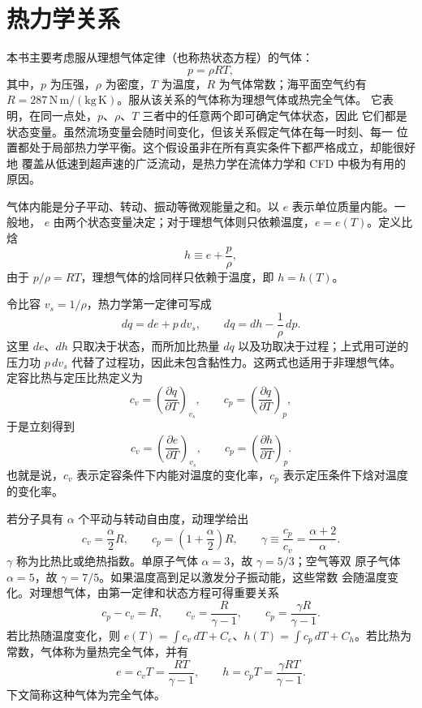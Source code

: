 \documentclass[11pt,a4paper,openany,fontset=none]{ctexbook}
\begin{document}
\section{热力学关系}

本书主要考虑服从理想气体定律（也称热状态方程）的气体：
\begin{equation}
  p=\rho RT,
\end{equation}
其中，$p$ 为压强，$\rho$ 为密度，$T$ 为温度，$R$ 为气体常数；海平面空气约有
$R=287\,\mathrm{N\,m/(kg\,K)}$。服从该关系的气体称为理想气体或热完全气体。
它表明，在同一点处，$p$、$\rho$、$T$ 三者中的任意两个即可确定气体状态，因此
它们都是状态变量。虽然流场变量会随时间变化，但该关系假定气体在每一时刻、每一
位置都处于局部热力学平衡。这个假设虽非在所有真实条件下都严格成立，却能很好地
覆盖从低速到超声速的广泛流动，是热力学在流体力学和 CFD 中极为有用的原因。

气体内能是分子平动、转动、振动等微观能量之和。以 $e$ 表示单位质量内能。一般地，
$e$ 由两个状态变量决定；对于理想气体则只依赖温度，$e=e(T)$。定义比焓
\begin{equation}
  h\equiv e+\frac{p}{\rho},
\end{equation}
由于 $p/\rho=RT$，理想气体的焓同样只依赖于温度，即 $h=h(T)$。

令比容 $v_s=1/\rho$，热力学第一定律可写成
\begin{equation}
  dq=de+p\,dv_s,
  \qquad
  dq=dh-\frac{1}{\rho}\,dp .
\end{equation}
这里 $de$、$dh$ 只取决于状态，而所加比热量 $dq$ 以及功取决于过程；上式用可逆的
压力功 $p\,dv_s$ 代替了过程功，因此未包含黏性力。这两式也适用于非理想气体。
定容比热与定压比热定义为
\begin{equation}
 c_v=\left(\frac{\partial q}{\partial T}\right)_{v_s},\qquad
 c_p=\left(\frac{\partial q}{\partial T}\right)_p,
\end{equation}
于是立刻得到
\begin{equation}
 c_v=\left(\frac{\partial e}{\partial T}\right)_{v_s},\qquad
 c_p=\left(\frac{\partial h}{\partial T}\right)_p.
\end{equation}
也就是说，$c_v$ 表示定容条件下内能对温度的变化率，$c_p$ 表示定压条件下焓对温度
的变化率。

若分子具有 $\alpha$ 个平动与转动自由度，动理学给出
\begin{equation}
 c_v=\frac{\alpha}{2}R,\qquad
 c_p=\left(1+\frac{\alpha}{2}\right)R,
 \qquad
 \gamma\equiv\frac{c_p}{c_v}=\frac{\alpha+2}{\alpha}.
\end{equation}
$\gamma$ 称为比热比或绝热指数。单原子气体 $\alpha=3$，故 $\gamma=5/3$；空气等双
原子气体 $\alpha=5$，故 $\gamma=7/5$。如果温度高到足以激发分子振动能，这些常数
会随温度变化。对理想气体，由第一定律和状态方程可得重要关系
\begin{equation}
 c_p-c_v=R,
 \qquad c_v=\frac{R}{\gamma-1},
 \qquad c_p=\frac{\gamma R}{\gamma-1}.
\end{equation}
若比热随温度变化，则 $e(T)=\int c_v\,dT+C_e$、$h(T)=\int c_p\,dT+C_h$。若比热为
常数，气体称为量热完全气体，并有
\begin{equation}
 e=c_v T=\frac{RT}{\gamma-1},\qquad
 h=c_p T=\frac{\gamma RT}{\gamma-1}.
\end{equation}
下文简称这种气体为完全气体。
\end{document}
